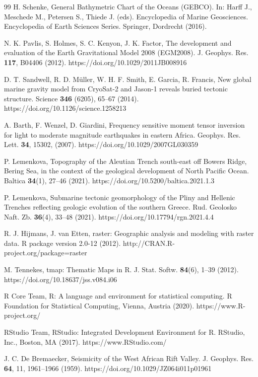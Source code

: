 \documentclass[myclassdoc,debug]{rjparticle}
\begin{document}
\begin{thebibliography}{99}
H. Schenke, General Bathymetric Chart of the Oceans (GEBCO). In: Harff J., Meschede M., Petersen S., Thiede J. (eds). Encyclopedia of Marine Geosciences. Encyclopedia of Earth Sciences Series. Springer, Dordrecht (2016).

N. K. Pavlis, S. Holmes, S. C. Kenyon, J. K. Factor, The development and evaluation of the Earth Gravitational Model 2008 (EGM2008). J. Geophys. Res. \textbf{117}, B04406 (2012). https://doi.org/10.1029/2011JB008916 

D. T. Sandwell, R. D. Müller, W. H. F. Smith, E. Garcia, R. Francis, New global marine gravity model from CryoSat-2 and Jason-1 reveals buried tectonic structure. Science \textbf{346} (6205), 65--67 (2014). https://doi.org/10.1126/science.1258213

A. Barth, F. Wenzel, D. Giardini, Frequency sensitive moment tensor inversion for light to moderate magnitude earthquakes in eastern Africa. Geophys. Res. Lett. \textbf{34}, 15302, (2007). https://doi.org/10.1029/2007GL030359

P. Lemenkova, Topography of the Aleutian Trench south-east off Bowers Ridge, Bering Sea, in the context of the geological development of North Pacific Ocean. Baltica \textbf{34}(1), 27--46 (2021). https://doi.org/10.5200/baltica.2021.1.3

P. Lemenkova, Submarine tectonic geomorphology of the Pliny and Hellenic Trenches reflecting geologic evolution of the southern Greece. Rud. Geolosko Naft. Zb. \textbf{36}(4), 33--48 (2021). https://doi.org/10.17794/rgn.2021.4.4

R. J. Hijmans, J. van Etten, raster: Geographic analysis and modeling with raster data. R package version 2.0-12 (2012). http://CRAN.R-project.org/package=raster

M. Tennekes, tmap: Thematic Maps in R. J. Stat. Softw. \textbf{84}(6), 1--39 (2012). https://doi.org/10.18637/jss.v084.i06

R Core Team, R: A language and environment for statistical computing. R Foundation for Statistical Computing, Vienna, Austria (2020). https://www.R-project.org/

RStudio Team, RStudio: Integrated Development Environment for R. RStudio, Inc., Boston, MA (2017). https://www.RStudio.com/

J. C. De Bremaecker, Seismicity of the West African Rift Valley. J. Geophys. Res. \textbf{64}, 11, 1961--1966 (1959). https://doi.org/10.1029/JZ064i011p01961


\end{thebibliography}
\end{document}
